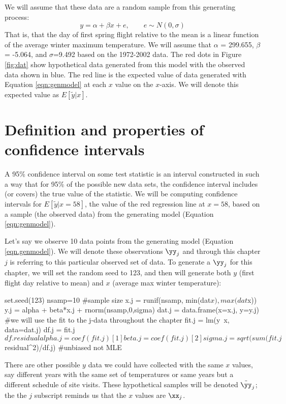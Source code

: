 We will assume that these data are a random sample from this generating process:
\begin{equation}\label{eqn:genmodel}
y = \alpha + \beta x + e, \quad\quad e \sim N(0,\sigma)
\end{equation}
That is, that the day of first spring flight relative to the mean is a linear function of the average winter maximum temperature. We will assume that $\alpha$ = 299.655, $\beta$= -5.064, and $\sigma$=9.492 based on the 1972-2002 data.  The red dots in Figure \ref{fig:dat} show hypothetical data generated from this model with the observed data shown in blue. The red line is the expected value of data generated with Equation \ref{eqn:genmodel} at each $x$ value on the $x$-axis.  We will denote this expected value as $E[\tilde{y}|x]$.

\section{Definition and properties of confidence intervals }

A 95\% confidence interval on some test statistic is an interval constructed in such a way that for 95\% of the possible new data sets, the confidence interval includes (or covers) the true value of the statistic.  We will be computing
confidence intervals for $E[\tilde{y}|x=58]$, the value of the red regression line at $x=58$, based on a sample (the observed data) from the generating model (Equation \ref{eqn:genmodel}).

Let's say we observe 10 data points from the generating model (Equation \ref{eqn.genmodel}). We will denote these observations $\yy_j$ and through this chapter $j$ is referring to this particular observed set of data.
To generate a $\yy_j$ for this chapter, we will set the random seed to 123, and then will generate both $y$ (first flight day relative to mean) and $x$ (average max winter temperature):
\begin{Schunk}
\begin{Sinput}
 set.seed(123)
 nsamp=10 #sample size
 x.j = runif(nsamp, min(dat$x), max(dat$x))
 y.j =  alpha + beta*x.j + rnorm(nsamp,0,sigma)
 dat.j = data.frame(x=x.j, y=y.j)
 #we will use the fit to the j-data throughout the chapter
 fit.j = lm(y~x, data=dat.j)
 df.j = fit.j$df.residual
 alpha.j = coef(fit.j)[1]
 beta.j = coef(fit.j)[2]
 sigma.j = sqrt(sum(fit.j$residual^2)/df.j) #unbiased not MLE
\end{Sinput}
\end{Schunk}
There are other possible $y$ data we could have collected with the same $x$ values, say different years with the same set of temperatures or same years but a different schedule of site visits.  These hypothetical samples will be denoted $\tilde{\yy}_j$; the the $j$ subscript reminds us that the $x$ values are $\xx_j$.

